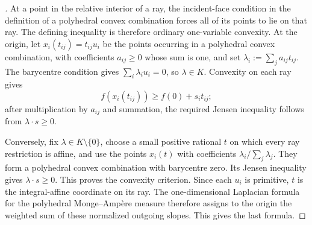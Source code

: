 
\begin{proof}[]
At a point in the relative interior of a ray, the incident-face condition
in the definition of a polyhedral convex combination forces all of its
points to lie on that ray.  The defining inequality is therefore ordinary
one-variable convexity.  At the origin,
let $x_i(t_{ij})=t_{ij}u_i$ be the points occurring in a polyhedral convex
combination, with coefficients $a_{ij}\geq0$ whose sum is one, and set
$
 \lambda_i:=\sum_j a_{ij}t_{ij}
$.
The barycentre condition gives
$
 \sum_i\lambda_i u_i=0
$, so $\lambda\in K$.  Convexity on each ray gives
\[
 f(x_i(t_{ij}))\geq f(0)+s_i t_{ij};
\]
after multiplication by $a_{ij}$ and summation, the required Jensen
inequality follows from $\lambda\cdot s\geq0$.

Conversely, fix $\lambda\in K\setminus\{0\}$, choose a small positive
rational $t$ on which every ray restriction is affine, and use the points
$x_i(t)$ with coefficients
$
 \lambda_i/\sum_j\lambda_j
$.
They form a polyhedral convex combination with barycentre zero.  Its Jensen
inequality gives $\lambda\cdot s\geq0$.  This proves the convexity
criterion.  Since each $u_i$ is primitive, $t$ is the integral-affine
coordinate on its ray.  The one-dimensional Laplacian formula for the
polyhedral Monge--Amp\`ere measure therefore assigns to the origin the
weighted sum of these normalized outgoing slopes.  This gives the last
formula.
\end{proof}

